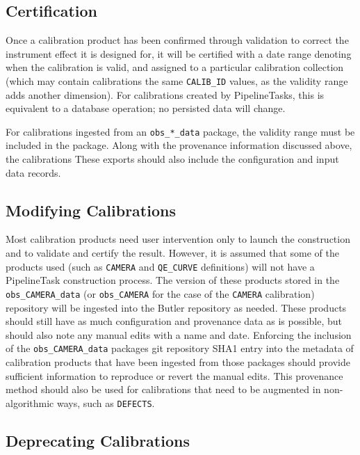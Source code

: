 \documentclass[DM,authoryear,toc]{lsstdoc}
\begin{document}
\subsection{Certification}

Once a calibration product has been confirmed through validation to
correct the instrument effect it is designed for, it will be certified
with a date range denoting when the calibration is valid, and assigned
to a particular calibration collection (which may contain calibrations
the same \verb|CALIB_ID| values, as the validity range adds another
dimension).  For calibrations created by PipelineTasks, this is
equivalent to a database operation; no persisted data will change.

For calibrations ingested from an \verb|obs_*_data| package, the
validity range must be included in the package.  Along with the provenance information discussed above, the calibrations These exports should also include the configuration and
input data records.

\subsection{Modifying Calibrations}

Most calibration products need user intervention only to launch the
construction and to validate and certify the result.  However, it is
assumed that some of the products used (such as \verb|CAMERA| and
\verb|QE_CURVE| definitions) will not have a PipelineTask construction
process.  The version of these products stored in the
\verb|obs_CAMERA_data| (or \verb|obs_CAMERA| for the case of the
\verb|CAMERA| calibration) repository will be ingested into the Butler
repository as needed.  These products should still have as much
configuration and provenance data as is possible, but should also note
any manual edits with a name and date.  Enforcing the inclusion of the
\verb|obs_CAMERA_data| packages git repository SHA1 entry into the
metadata of calibration products that have been ingested from those
packages should provide sufficient information to reproduce or revert
the manual edits.  This provenance method should also be used for
calibrations that need to be augmented in non-algorithmic ways, such
as \verb|DEFECTS|.

\subsection{Deprecating Calibrations}
\end{document}
